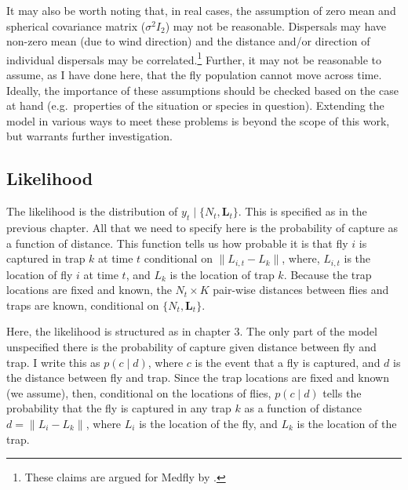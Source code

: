 \documentclass[
  oneside]{book}
\begin{document}
It may also be worth noting that, in real cases, the assumption of zero mean and spherical covariance matrix (\(\sigma^2 I_2\)) may not be reasonable. Dispersals may have non-zero mean (due to wind direction) and the distance and/or direction of individual dispersals may be correlated.\footnote{These claims are argued for Medfly by \citet{baker1986}.} Further, it may not be reasonable to assume, as I have done here, that the fly population cannot move across time. Ideally, the importance of these assumptions should be checked based on the case at hand (e.g.~properties of the situation or species in question). Extending the model in various ways to meet these problems is beyond the scope of this work, but warrants further investigation.

\hypertarget{likelihood}{%
\subsection{Likelihood}\label{likelihood}}

The likelihood is the distribution of \(y_t \mid \{N_t, \mathbf L_t\}\). This is specified as in the previous chapter. All that we need to specify here is the probability of capture as a function of distance. This function tells us how probable it is that fly \(i\) is captured in trap \(k\) at time \(t\) conditional on \(\lVert L_{i, t} - L_k \rVert\), where, \(L_{i, t}\) is the location of fly \(i\) at time \(t\), and \(L_k\) is the location of trap \(k\). Because the trap locations are fixed and known, the \(N_t \times K\) pair-wise distances between flies and traps are known, conditional on \(\{N_t, \mathbf L_t\}\).

Here, the likelihood is structured as in chapter 3. The only part of the model unspecified there is the probability of capture given distance between fly and trap. I write this as \(p(c \mid d)\), where \(c\) is the event that a fly is captured, and \(d\) is the distance between fly and trap. Since the trap locations are fixed and known (we assume), then, conditional on the locations of flies, \(p(c \mid d)\) tells the probability that the fly is captured in any trap \(k\) as a function of distance \(d = \lVert L_{i} - L_k \rVert\), where \(L_i\) is the location of the fly, and \(L_k\) is the location of the trap.
\end{document}
